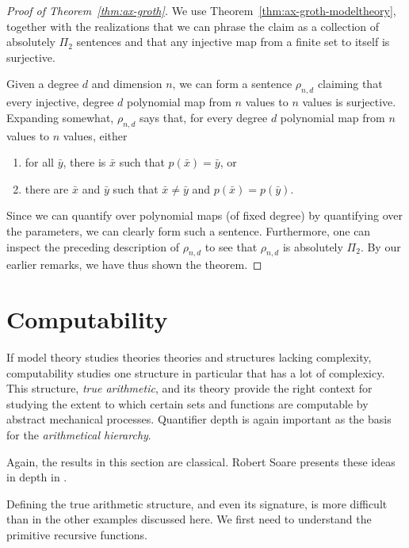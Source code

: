 \documentclass{article}
\theoremstyle{plain}
\theoremstyle{definition}
\newcommand{\defterm}{\emph}
\newcommand{\tuple}{\bar}
\begin{document}
\begin{proof}[Proof of Theorem~\ref{thm:ax-groth}]
  We use Theorem~\ref{thm:ax-groth-modeltheory}, together with the
  realizations that we can phrase the claim as a collection of
  absolutely $\Pi_2$ sentences and that any injective map from a
  finite set to itself is surjective.

  Given a degree $d$ and dimension $n$, we can form a sentence
  $\rho_{n,d}$ claiming that every injective, degree $d$ polynomial
  map from $n$ values to $n$ values is surjective. Expanding somewhat,
  $\rho_{n,d}$ says that, for every degree $d$ polynomial map from $n$
  values to $n$ values, either
  \begin{enumerate}
  \item for all $\tuple{y}$, there is $\tuple{x}$ such that $p(\tuple{x}) = \tuple{y}$, or
  \item there are $\tuple{x}$ and $\tuple{y}$ such that $\tuple{x}
    \neq \tuple{y}$ and $p(\tuple{x}) = p(\tuple{y})$.
  \end{enumerate}
  Since we can quantify over polynomial maps (of fixed degree) by
  quantifying over the parameters, we can clearly form such a
  sentence. Furthermore, one can inspect the preceding description of
  $\rho_{n,d}$ to see that $\rho_{n,d}$ is absolutely $\Pi_2$. By our
  earlier remarks, we have thus shown the theorem.
\end{proof}

\section{Computability}

If model theory studies theories theories and structures lacking
complexity, computability studies one structure in particular that has
a lot of complexicy. This structure, \defterm{true arithmetic}, and
its theory provide the right context for studying the extent to which
certain sets and functions are computable by abstract mechanical
processes. Quantifier depth is again important as the basis for the
\defterm{arithmetical hierarchy}.

Again, the results in this section are classical. Robert Soare
presents these ideas in depth in \cite{soare}.

Defining the true arithmetic structure, and even its signature, is
more difficult than in the other examples discussed here. We first
need to understand the primitive recursive functions.
\end{document}
